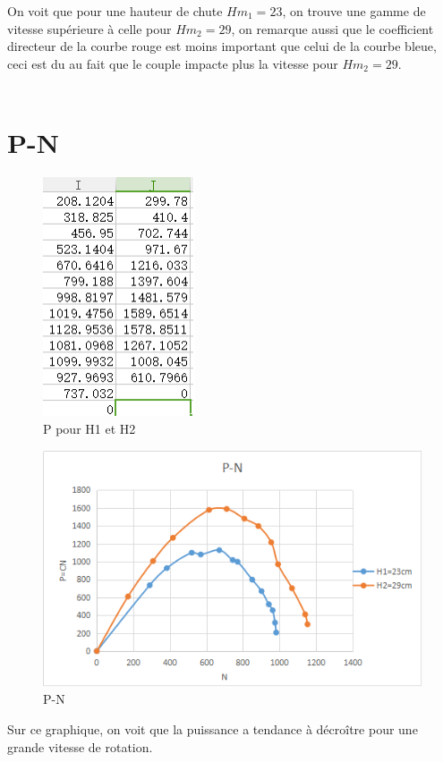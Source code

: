 \documentclass[a4paper,10pt]{report} %
\begin{document}
On voit que pour une hauteur de chute $Hm_1=23$, on trouve une gamme de vitesse supérieure à celle pour $Hm_2=29$, on remarque aussi que le coefficient directeur de la courbe rouge est moins important que celui de la courbe bleue, ceci est du au fait que le couple impacte plus la vitesse pour $Hm_2=29$.\\
\\
\section{P-N}

\begin{figure}[h!]
\centering
\includegraphics[width=0.4\textwidth]{fig/figure7.png}
\caption{P pour H1 et H2}
\end{figure}

\begin{figure}[h!]
\centering
\includegraphics[width=1.0\textwidth]{fig/figure8.png}
\caption{P-N}
\end{figure}
Sur ce graphique, on voit que la puissance a tendance à décroître pour une grande vitesse de rotation.\\
\end{document}

